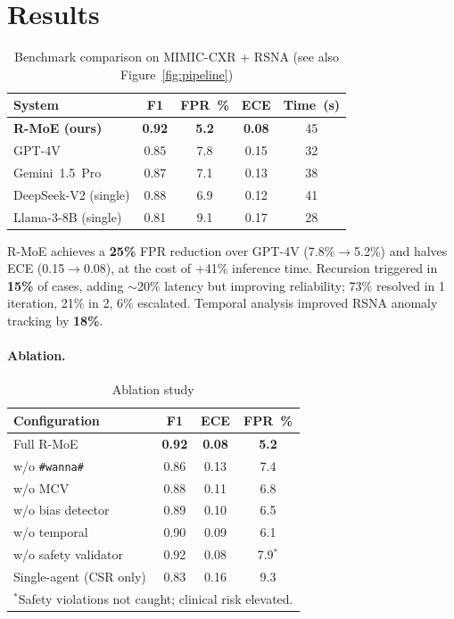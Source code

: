 \documentclass[10pt,twocolumn]{article}
\begin{document}
\section{Results}
\label{sec:results}

\begin{table}[h]
  \centering
  \caption{Benchmark comparison on MIMIC-CXR + RSNA (see also Figure~\ref{fig:pipeline})}
  \label{tab:results}
  \begin{tabular}{@{}lcccc@{}}
    \toprule
    \textbf{System} & \textbf{F1} & \textbf{FPR~\%} & \textbf{ECE} & \textbf{Time~(s)} \\
    \midrule
    \textbf{R-MoE (ours)} & \textbf{0.92} & \textbf{5.2} & \textbf{0.08} & 45 \\
    GPT-4V                 & 0.85 & 7.8 & 0.15 & 32 \\
    Gemini~1.5~Pro         & 0.87 & 7.1 & 0.13 & 38 \\
    DeepSeek-V2 (single)   & 0.88 & 6.9 & 0.12 & 41 \\
    Llama-3-8B (single)    & 0.81 & 9.1 & 0.17 & 28 \\
    \bottomrule
  \end{tabular}
\end{table}

R-MoE achieves a \textbf{25\%} FPR reduction over GPT-4V (7.8\%$\to$5.2\%) and
halves ECE (0.15$\to$0.08), at the cost of +41\% inference time.
Recursion triggered in \textbf{15\%} of cases, adding $\sim$20\% latency but
improving reliability; 73\% resolved in 1 iteration, 21\% in 2, 6\% escalated.
Temporal analysis improved RSNA anomaly tracking by \textbf{18\%}.

\paragraph{Ablation.}

\begin{table}[h]
  \centering
  \small
  \caption{Ablation study}
  \label{tab:ablation}
  \begin{tabular}{@{}lccc@{}}
    \toprule
    \textbf{Configuration} & \textbf{F1} & \textbf{ECE} & \textbf{FPR~\%} \\
    \midrule
    Full R-MoE              & \textbf{0.92} & \textbf{0.08} & \textbf{5.2} \\
    w/o \texttt{\#wanna\#}  & 0.86 & 0.13 & 7.4 \\
    w/o MCV                 & 0.88 & 0.11 & 6.8 \\
    w/o bias detector       & 0.89 & 0.10 & 6.5 \\
    w/o temporal            & 0.90 & 0.09 & 6.1 \\
    w/o safety validator    & 0.92 & 0.08 & 7.9$^*$ \\
    Single-agent (CSR only) & 0.83 & 0.16 & 9.3 \\
    \bottomrule
    \multicolumn{4}{l}{\footnotesize $^*$Safety violations not caught; clinical risk elevated.}
  \end{tabular}
\end{table}
\end{document}
